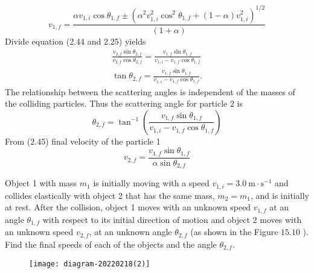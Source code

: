 $$
v_{1, f}=\frac{\alpha v_{1, i} \cos \theta_{1, f} \pm\left(\alpha^{2} v_{1, i}^{2} \cos ^{2} \theta_{1, f}+(1-\alpha) v_{1, i}^{2}\right)^{1 / 2}}{(1+\alpha)}
$$
Divide equation (2.44 and 2.25) yields\\
$$\begin{gathered}
\frac{v_{2, f} \sin \theta_{2, f}}{v_{2, f} \cos \theta_{2, f}}=\frac{v_{1, f} \sin \theta_{1, f}}{v_{1, i}-v_{1, f} \cos \theta_{1, f}} \\
\tan \theta_{2, f}=\frac{v_{1, f} \sin \theta_{1, f}}{v_{1, i}-v_{1, f} \cos \theta_{1, f}} .
\end{gathered}$$
The relationship between the scattering angles is independent of the masses of the colliding particles. Thus the scattering angle for particle 2 is
$$\theta_{2, f}=\tan ^{-1}\left(\frac{v_{1, f} \sin \theta_{1, f}}{v_{1, i}-v_{1, f} \cos \theta_{1, f}}\right)$$
From (2.45) final velocity of the particle 1\\
$$v_{2, f}=\frac{v_{1, f} \sin \theta_{1, f}}{\alpha \sin \theta_{2, f}}$$
\begin{exercise}
	Object 1 with mass $m_{1}$ is initially moving with a speed $v_{1, i}=3.0 \mathrm{~m} \cdot \mathrm{s}^{-1}$ and collides elastically with object 2 that has the same mass, $m_{2}=m_{1}$, and is initially at rest. After the collision, object 1 moves with an unknown speed $v_{1, f}$ at an angle $\theta_{1, f}$ with respect to its initial direction of motion and object 2 moves with an unknown speed $v_{2, f}$, at an unknown angle $\theta_{2, f}$ (as shown in the Figure $15.10$ ). Find the final speeds of each of the objects and the angle $\theta_{2, f}$.\\
	\begin{figure}[H]
		\centering
		\texttt{[image: diagram-20220218(2)]}
	\end{figure}
\end{exercise}
